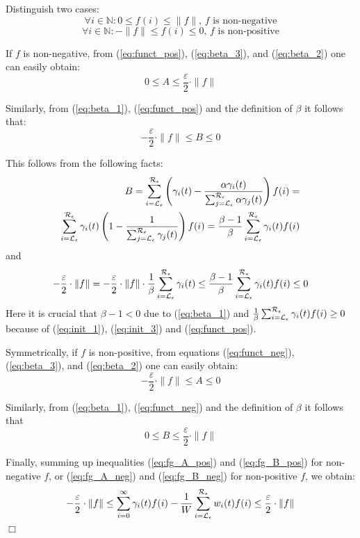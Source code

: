 \documentclass[times, 10pt,twocolumn]{article}
\newenvironment{proof}{\trivlist \item[\hskip \labelsep{\bf Proof}]}{\hfill\hbox{$\Box$}\endtrivlist}
\begin{document}
{\begin{proof}
		Distinguish two cases:
		\begin{equation}
			\forall i \in \mathbb{N} : 0 \leq f(i) \leq \|f\| \text{, $f$ is non-negative} \label{eq:funct_pos}
		\end{equation}
		\begin{equation}
			\forall i \in \mathbb{N} : -\|f\| \leq f(i) \leq 0 \text{, $f$ is non-positive} \label{eq:funct_neg}
		\end{equation}
		
		If $f$ is non-negative, from (\ref{eq:funct_pos}), (\ref{eq:beta_3}), and (\ref{eq:beta_2}) one can easily obtain:
		\begin{equation}
			0 \leq A \leq \frac{\varepsilon}{2} \cdot \|f\|
			\label{eq:fg_A_pos}
		\end{equation}
		
		Similarly, from (\ref{eq:beta_1}), (\ref{eq:funct_pos}) and the definition of $\beta$ it follows that:
		\begin{equation}
			- \frac{\varepsilon}{2} \cdot \|f\| \leq B \leq 0
			\label{eq:fg_B_pos}
		\end{equation}
		
		This follows from the following facts:
		\begin{eqnarray}
			B = \sum_{i = \mathcal{L}_{\epsilon}}^{\mathcal{R}_{\epsilon}} \left( \gamma_{i}(t) - \frac{\alpha \gamma_{i}(t) }{\sum^{\mathcal{R}_{\epsilon}}_{j=\mathcal{L}_{\epsilon}} \alpha \gamma_{j}(t)} \right) f(i) = \nonumber \\
			\sum_{i = \mathcal{L}_{\epsilon}}^{\mathcal{R}_{\epsilon}} \gamma_{i}(t) \left( 1 - \frac{1}{\sum^{\mathcal{R}_{\epsilon}}_{j=\mathcal{L}_{\epsilon}} \gamma_{j}(t)} \right) f(i) = \frac{\beta - 1}{\beta} \sum_{i = \mathcal{L}_{\epsilon}}^{\mathcal{R}_{\epsilon}} \gamma_{i}(t)  f(i)\nonumber
		\end{eqnarray}
		and
		\[
			- \frac{\varepsilon}{2} \cdot \|f\| = - \frac{\varepsilon}{2} \cdot \|f\|\cdot \frac{1}{\beta} \sum_{i = \mathcal{L}_{\epsilon}}^{\mathcal{R}_{\epsilon}} \gamma_{i}(t) \leq \frac{\beta - 1}{\beta} \sum_{i = \mathcal{L}_{\epsilon}}^{\mathcal{R}_{\epsilon}} \gamma_{i}(t)  f(i) \leq 0
		\]  
		Here it is crucial that $\beta - 1 < 0$ due to (\ref{eq:beta_1}) and $\frac{1}{\beta} \sum_{i = \mathcal{L}_{\epsilon}}^{\mathcal{R}_{\epsilon}} \gamma_{i}(t)  f(i) \geq 0$ because of (\ref{eq:init_1}), (\ref{eq:init_3}) and  (\ref{eq:funct_pos}).
		
		Symmetrically, if $f$ is non-positive, from equations (\ref{eq:funct_neg}), (\ref{eq:beta_3}), and (\ref{eq:beta_2}) one can easily obtain:
		\begin{equation}
			- \frac{\varepsilon}{2} \cdot \|f\| \leq A \leq 0
			\label{eq:fg_A_neg}
		\end{equation}
		
		Similarly, from (\ref{eq:beta_1}), (\ref{eq:funct_neg}) and the definition of $\beta$ it follows that
		\begin{equation}
			0 \leq B \leq \frac{\varepsilon}{2} \cdot \|f\|
			\label{eq:fg_B_neg}
		\end{equation}
		
		Finally, summing up inequalities (\ref{eq:fg_A_pos}) and (\ref{eq:fg_B_pos}) for non-negative $f$, or (\ref{eq:fg_A_neg}) and (\ref{eq:fg_B_neg}) for non-positive $f$, we obtain:
		\[
			- \frac{\varepsilon}{2} \cdot \|f\| \leq \sum_{i=0}^{\infty} \gamma_{i}(t) f(i) - \frac{1}{W}\sum_{i = \mathcal{L}_{\epsilon}}^{\mathcal{R}_{\epsilon}} w_{i}(t) f(i) \leq \frac{\varepsilon}{2} \cdot \|f\|
		\]
	\end{proof}
	}
\end{document}
